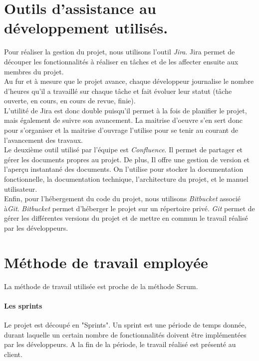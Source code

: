 \section{Outils d'assistance au développement utilisés.}
Pour réaliser la gestion du projet, nous utilisons l'outil \textit{Jira}.
Jira permet de découper les fonctionnalités à réaliser en tâches et de les affecter ensuite aux membres du projet.\\
Au fur et à mesure que le projet avance, chaque développeur journalise le nombre d'heures qu'il a travaillé sur chaque tâche et fait évoluer leur statut (tâche ouverte, en cours, en cours de revue, finie).\\
L'utilité de Jira est donc double puisqu'il permet à la fois de planifier le projet, mais également de suivre son avancement. La maitrise d'oeuvre s'en sert donc pour s'organiser et la maitrise d'ouvrage l'utilise pour se tenir au courant de l'avancement des travaux.\\

Le deuxième outil utilisé par l'équipe est \textit{Confluence}. Il permet de partager et gérer les documents propres au projet. De plus, Il offre une gestion de version et l'aperçu instantané des documents. On l'utilise pour stocker la documentation fonctionnelle, la documentation technique, l'architecture du projet, et le manuel utilisateur.\\

Enfin, pour l'hébergement du code du projet, nous utilisons \textit{Bitbucket} associé à\textit{Git}. \textit{Bitbucket} permet d'héberger le projet sur un répertoire privé. \textit{Git} permet de gérer les différentes versions du projet et de mettre en commun le travail réalisé par les développeurs. 


\section{Méthode de travail employée}
La méthode de travail utilisée est proche de la méthode Scrum.
\paragraph*{Les sprints}
Le projet est découpé en "Sprints". Un sprint est une période de temps donnée, durant laquelle un certain nombre de fonctionnalités doivent être implémentées par les développeurs. A la fin de la période, le travail réalisé est présenté au client.\\

